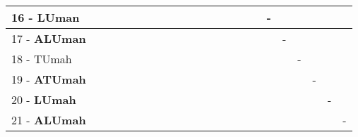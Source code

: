 \begin{table}[h]
\begin{center}
\begin{tabular}{lcc|cc|cc|cc|cc|cc|cc|cc|cc|cc|c}
16 - \textbf{LUman}	&   &   &   &   &   &   &   &   &   &   &   &   &   &   &   & - &   &   &   &   &   \\ \hline
17 - \textbf{ALUman}	&   &   &   &   &   &   &   &   &   &   &   &   &   &   &   &   & - &   &   &   &   \\
18 - TUmah	&   &   &   &   &   &   &   &   &   &   &   &   &   &   &   &   &   & - &   &   &   \\ \hline
19 - \textbf{ATUmah}	&   &   &   &   &   &   &   &   &   &   &   &   &   &   &   &   &   &   & - &   &   \\
20 - \textbf{LUmah}	&   &   &   &   &   &   &   &   &   &   &   &   &   &   &   &   &   &   &   & - &   \\ \hline
21 - \textbf{ALUmah}	&   &   &   &   &   &   &   &   &   &   &   &   &   &   &   &   &   &   &   &   & - \\\end{tabular}
\label{stratsALCKappaFriedRF}
\end{center}
\end{table}